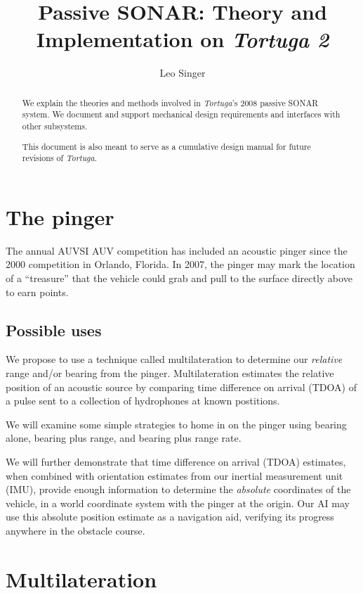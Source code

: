 \documentclass[10pt]{article}
\title{Passive SONAR: Theory and Implementation on \textit{Tortuga 2}}
\author{Leo Singer}
\begin{document}
\maketitle

\begin{abstract}
We explain the theories and methods involved in \textit{Tortuga}'s 2008 passive SONAR system.  We document and support mechanical design requirements and interfaces with other subsystems.

This document is also meant to serve as a cumulative design manual for future revisions of \textit{Tortuga}.
\end{abstract}

\tableofcontents

\clearpage

\section{The pinger}

The annual AUVSI AUV competition has included an acoustic pinger since the 2000 competition in Orlando, Florida.  In 2007, the pinger may mark the location of a ``treasure'' that the vehicle could grab and pull to the surface directly above to earn points.

\subsection{Possible uses}

We propose to use a technique called multilateration to determine our \emph{relative} range and/or bearing from the pinger.  Multilateration estimates the relative position of an acoustic source by comparing time difference on arrival (TDOA) of a pulse sent to a collection of hydrophones at known postitions.

We will examine some simple strategies to home in on the pinger using bearing alone, bearing plus range, and bearing plus range rate.

We will further demonstrate that time difference on arrival (TDOA) estimates, when combined with orientation estimates from our inertial measurement unit (IMU), provide enough information to determine the \emph{absolute} coordinates of the vehicle, in a world coordinate system with the pinger at the origin.  Our AI may use this absolute position estimate as a navigation aid, verifying its progress anywhere in the obstacle course.

\section{Multilateration}
\end{document}
